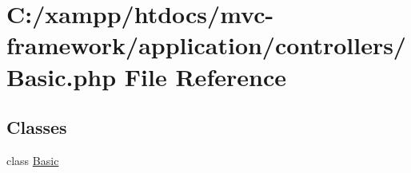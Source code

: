 \hypertarget{controllers_2_basic_8php}{}\section{C\+:/xampp/htdocs/mvc-\/framework/application/controllers/\+Basic.php File Reference}
\label{controllers_2_basic_8php}
\subsection*{Classes}
\begin{DoxyCompactItemize}
\item 
class \hyperlink{class_basic}{Basic}
\end{DoxyCompactItemize}
